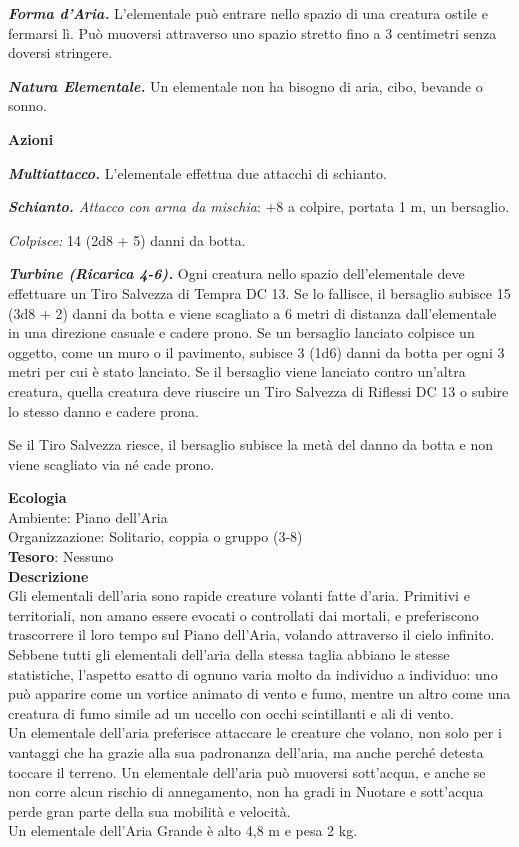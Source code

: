 \begin{multicols}{2}
	\textit{\textbf{Forma d'Aria.}} L'elementale può entrare nello spazio di una creatura ostile e fermarsi lì. Può muoversi attraverso uno spazio stretto fino a 3 centimetri senza doversi stringere.

	\textit{\textbf{Natura Elementale.}} Un elementale non ha bisogno di aria, cibo, bevande o sonno.

	\textbf{Azioni}

	\textit{\textbf{Multiattacco.}} L'elementale effettua due attacchi di schianto.

	\textit{\textbf{Schianto.} Attacco con arma da mischia}: +8 a colpire, portata 1 m, un bersaglio.

	\textit{Colpisce:} 14 (2d8 + 5) danni da botta.

	\textit{\textbf{Turbine (Ricarica 4-6).}} Ogni creatura nello spazio dell'elementale deve effettuare un Tiro Salvezza di Tempra DC 13. Se lo fallisce, il bersaglio subisce 15 (3d8 + 2) danni da botta e viene scagliato a 6 metri di distanza dall'elementale in una direzione casuale e cadere prono. Se un bersaglio lanciato colpisce un oggetto, come un muro o il pavimento, subisce 3 (1d6) danni da botta per ogni 3 metri per cui è stato lanciato. Se il bersaglio viene lanciato contro un'altra creatura, quella creatura deve riuscire un Tiro Salvezza di Riflessi DC 13 o subire lo stesso danno e cadere prona.

	Se il Tiro Salvezza riesce, il bersaglio subisce la metà del danno da botta e non viene scagliato via né cade prono.

	\textbf{Ecologia}\\
	Ambiente: Piano dell'Aria\\
	Organizzazione: Solitario, coppia o gruppo (3-8)\\
	\textbf{Tesoro}: Nessuno\\
	\textbf{Descrizione}\\
	Gli elementali dell'aria sono rapide creature volanti fatte d'aria. Primitivi e territoriali, non amano essere evocati o controllati dai mortali, e preferiscono trascorrere il loro tempo sul Piano dell'Aria, volando attraverso il cielo infinito.\\
	Sebbene tutti gli elementali dell'aria della stessa taglia abbiano le stesse statistiche, l'aspetto esatto di ognuno varia molto da individuo a individuo: uno può apparire come un vortice animato di vento e fumo, mentre un altro come una creatura di fumo simile ad un uccello con occhi scintillanti e ali di vento.\\
	Un elementale dell'aria preferisce attaccare le creature che volano, non solo per i vantaggi che ha grazie alla sua padronanza dell'aria, ma anche perché detesta toccare il terreno. Un elementale dell'aria può muoversi sott'acqua, e anche se non corre alcun rischio di annegamento, non ha gradi in Nuotare e sott'acqua perde gran parte della sua mobilità e velocità.\\
	Un elementale dell'Aria Grande è alto 4,8 m e pesa 2 kg.


\end{multicols}
